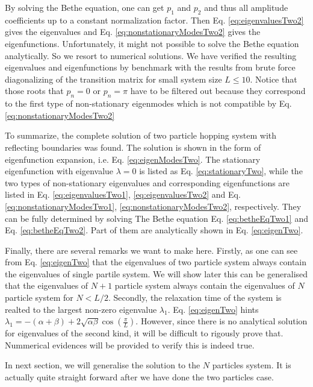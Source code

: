 \documentclass[12pt,a4paper]{article}
\begin{document}
By solving the Bethe equation, one can get $p_1$ and $p_2$ and thus all
amplitude coefficients up to a constant normalization factor. Then Eq.
\eqref{eq:eigenvaluesTwo2} gives the eigenvalues and Eq.
\eqref{eq:nonstationaryModesTwo2} gives the eigenfunctions.
Unfortunately, it might not possible to solve the Bethe equation analytically.
So we resort to numerical solutions. We have verified the resulting eigenvalues
and eigenfunctions by benchmark with the results from brute force diagonalizing
of the transition matrix for small system size $L\le10$. Notice that those roots
that $p_n=0$ or $p_n=\pi$ have to be filtered out because they correspond to the
first type of non-stationary eigenmodes which is not compatible by Eq.
\eqref{eq:nonstationaryModesTwo2}


To summarize, the complete solution of two particle hopping system with
reflecting boundaries was found. The solution is shown in the form of
eigenfunction expansion, i.e. Eq. \eqref{eq:eigenModesTwo}. The stationary
eigenfunction with eigenvalue $\lambda=0$ is listed as Eq.
\eqref{eq:stationaryTwo}, while the two types of non-stationary eigenvalues and
corresponding eigenfunctions are listed in Eq. \eqref{eq:eigenvaluesTwo1},
\eqref{eq:eigenvaluesTwo2} and Eq.
\eqref{eq:nonstationaryModesTwo1}, \eqref{eq:nonstationaryModesTwo2},
respectively. They can be fully determined by  solving The Bethe equation Eq.
\eqref{eq:betheEqTwo1} and Eq. \eqref{eq:betheEqTwo2}. Part of them are
analytically shown in Eq. \eqref{eq:eigenTwo}.

Finally, there are several remarks we want to make here.
Firstly, as one can see from Eq.  \eqref{eq:eigenTwo} that the eigenvalues of two
particle system always contain the eigenvalues of single partile system. We will
show later this can be generalised that the eigenvalues of $N+1$ particle system
always contain the eigenvalues of $N$ particle system for $N<L/2$. Secondly, the
relaxation time of the system is realted to the largest non-zero eigenvalue
$\lambda_1$. Eq.  \eqref{eq:eigenTwo} hints
$\lambda_1=-(\alpha+\beta)+2\sqrt{\alpha\beta} \cos\left(\frac{\pi}{L}\right)$.
However, since there is no analytical solution for eigenvalues of the second
kind, it will be difficult to rigously prove that. Nummerical evidences will be
provided to verify this is indeed true.

In next section, we will generalise the solution to the $N$ particles system.
It is actually quite straight forward after we have done the two particles
case. 
\end{document}

